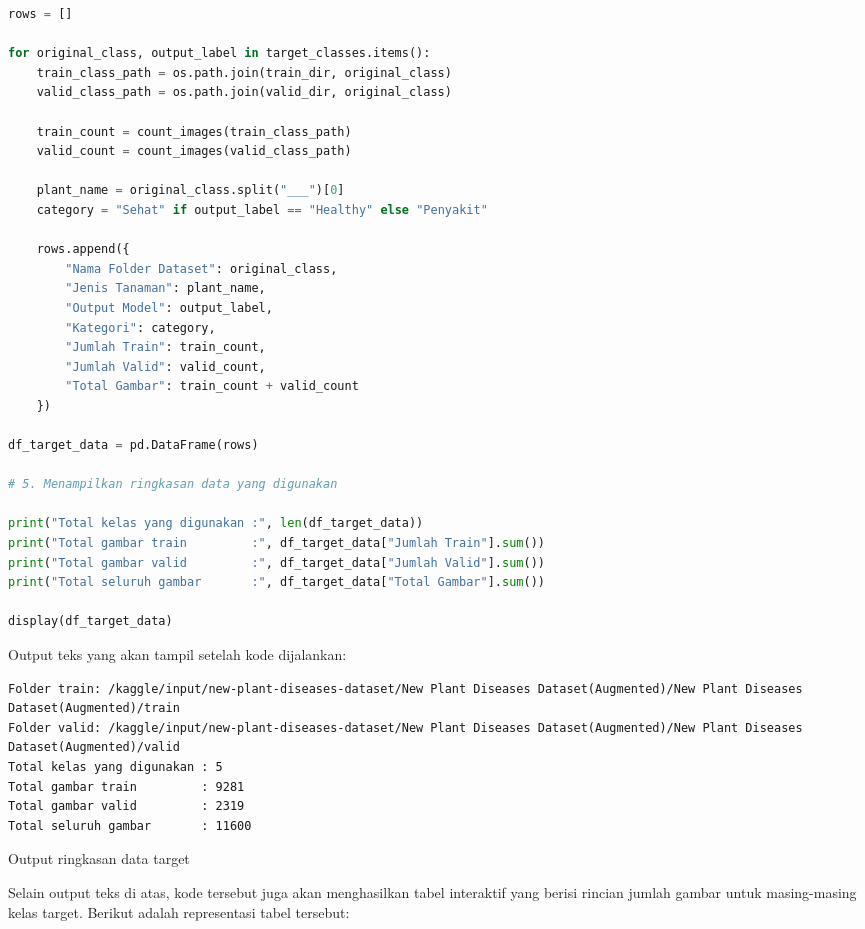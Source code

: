 \begin{lstlisting}[language=Python, caption=Menentukan dan menghitung data target]
rows = []

for original_class, output_label in target_classes.items():
    train_class_path = os.path.join(train_dir, original_class)
    valid_class_path = os.path.join(valid_dir, original_class)

    train_count = count_images(train_class_path)
    valid_count = count_images(valid_class_path)

    plant_name = original_class.split("___")[0]
    category = "Sehat" if output_label == "Healthy" else "Penyakit"

    rows.append({
        "Nama Folder Dataset": original_class,
        "Jenis Tanaman": plant_name,
        "Output Model": output_label,
        "Kategori": category,
        "Jumlah Train": train_count,
        "Jumlah Valid": valid_count,
        "Total Gambar": train_count + valid_count
    })

df_target_data = pd.DataFrame(rows)

# 5. Menampilkan ringkasan data yang digunakan

print("Total kelas yang digunakan :", len(df_target_data))
print("Total gambar train         :", df_target_data["Jumlah Train"].sum())
print("Total gambar valid         :", df_target_data["Jumlah Valid"].sum())
print("Total seluruh gambar       :", df_target_data["Total Gambar"].sum())

display(df_target_data)
\end{lstlisting}

Output teks yang akan tampil setelah kode dijalankan:

\begin{outputcode}[H]
\begin{lstlisting}[language={}]
Folder train: /kaggle/input/new-plant-diseases-dataset/New Plant Diseases Dataset(Augmented)/New Plant Diseases Dataset(Augmented)/train
Folder valid: /kaggle/input/new-plant-diseases-dataset/New Plant Diseases Dataset(Augmented)/New Plant Diseases Dataset(Augmented)/valid
Total kelas yang digunakan : 5
Total gambar train         : 9281
Total gambar valid         : 2319
Total seluruh gambar       : 11600
\end{lstlisting}
\caption{Output ringkasan data target}
\end{outputcode}

Selain output teks di atas, kode tersebut juga akan menghasilkan tabel interaktif yang berisi rincian jumlah gambar untuk masing-masing kelas target. Berikut adalah representasi tabel tersebut:

